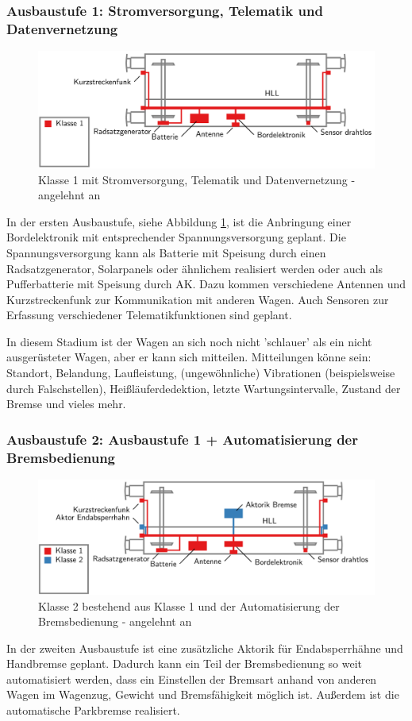 \subsubsection{Ausbaustufe 1: Stromversorgung, Telematik und Datenvernetzung}
\begin{figure}[hbp] 
    \includegraphics[width=\textwidth]{Bilder/Ausbaustufen_1.PNG}
    \caption{Klasse 1 mit Stromversorgung, Telematik und Datenvernetzung - angelehnt an \cite{ETR_3} }
    \label{fig:Klasse1}
\end{figure} 
In der ersten Ausbaustufe, siehe Abbildung \ref{fig:Klasse1}, ist die Anbringung einer Bordelektronik mit  entsprechender Spannungsversorgung geplant. Die Spannungsversorgung kann als Batterie mit Speisung durch einen Radsatzgenerator, Solarpanels oder ähnlichem realisiert werden oder auch als Pufferbatterie mit Speisung durch AK. Dazu kommen verschiedene Antennen und Kurzstreckenfunk zur Kommunikation mit anderen Wagen. Auch Sensoren zur Erfassung verschiedener Telematikfunktionen sind geplant.\par
In diesem Stadium ist der Wagen an sich noch nicht 'schlauer' als ein nicht ausgerüsteter Wagen, aber er kann sich mitteilen. Mitteilungen könne sein: Standort, Belandung, Laufleistung, (ungewöhnliche) Vibrationen (beispielsweise durch Falschstellen), Heißläuferdedektion, letzte Wartungsintervalle, Zustand der Bremse und vieles mehr.\par
\subsubsection{Ausbaustufe 2: Ausbaustufe 1 + Automatisierung der Bremsbedienung}
\begin{figure}[htbp] 
    \includegraphics[width=\textwidth]{Bilder/Ausbaustufen_2.PNG}
    \caption{Klasse 2 bestehend aus Klasse 1 und der Automatisierung der Bremsbedienung - angelehnt an \cite{ETR_3}}
    \label{fig:Klasse2}
\end{figure} 
In der zweiten Ausbaustufe ist eine zusätzliche Aktorik für Endabsperrhähne und Handbremse geplant. Dadurch kann ein Teil der Bremsbedienung so weit automatisiert werden, dass ein Einstellen der Bremsart anhand von anderen Wagen im Wagenzug, Gewicht und Bremsfähigkeit möglich ist. Außerdem ist die automatische Parkbremse realisiert.\par
